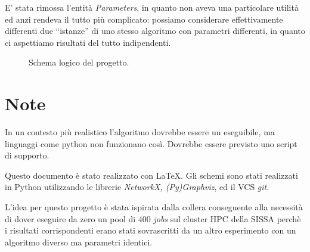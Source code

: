 \documentclass{article}
\begin{document}
E' stata rimossa l'entità \emph{Parameters}, in quanto non aveva una particolare utilità ed anzi rendeva il tutto più complicato: possiamo considerare effettivamente differenti due ``istanze'' di uno stesso algoritmo con parametri differenti, in quanto ci aspettiamo risultati del tutto indipendenti.
\begin{figure}[H]
    \caption{Schema logico del progetto.}
\end{figure}

\section{Note}
In un contesto più realistico l'algoritmo dovrebbe essere un eseguibile, ma linguaggi come python non funzionano così. Dovrebbe essere previsto uno script di supporto.

Questo documento è stato realizzato con \LaTeX. Gli schemi sono stati realizzati in Python utilizzando le librerie \emph{NetworkX, (Py)Graphviz}, ed il VCS \emph{git}.

L'idea per questo progetto è stata ispirata dalla collera conseguente alla necessità di dover eseguire da zero un pool di 400 \emph{jobs} sul cluster HPC della SISSA perchè i risultati corrispondenti erano stati sovrascritti da un altro esperimento con un algoritmo diverso ma parametri identici.
\end{document}
